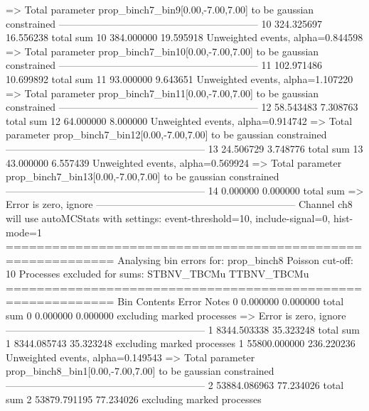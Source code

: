   => Total parameter prop_binch7_bin9[0.00,-7.00,7.00] to be gaussian constrained
------------------------------------------------------------
10         324.325697      16.556238       total sum                     
10         384.000000      19.595918       Unweighted events, alpha=0.844598
  => Total parameter prop_binch7_bin10[0.00,-7.00,7.00] to be gaussian constrained
------------------------------------------------------------
11         102.971486      10.699892       total sum                     
11         93.000000       9.643651        Unweighted events, alpha=1.107220
  => Total parameter prop_binch7_bin11[0.00,-7.00,7.00] to be gaussian constrained
------------------------------------------------------------
12         58.543483       7.308763        total sum                     
12         64.000000       8.000000        Unweighted events, alpha=0.914742
  => Total parameter prop_binch7_bin12[0.00,-7.00,7.00] to be gaussian constrained
------------------------------------------------------------
13         24.506729       3.748776        total sum                     
13         43.000000       6.557439        Unweighted events, alpha=0.569924
  => Total parameter prop_binch7_bin13[0.00,-7.00,7.00] to be gaussian constrained
------------------------------------------------------------
14         0.000000        0.000000        total sum                     
  => Error is zero, ignore      
------------------------------------------------------------
Channel ch8 will use autoMCStats with settings: event-threshold=10, include-signal=0, hist-mode=1
============================================================
Analysing bin errors for: prop_binch8
Poisson cut-off: 10
Processes excluded for sums: STBNV_TBCMu TTBNV_TBCMu
============================================================
Bin        Contents        Error           Notes                         
0          0.000000        0.000000        total sum                     
0          0.000000        0.000000        excluding marked processes    
  => Error is zero, ignore      
------------------------------------------------------------
1          8344.503338     35.323248       total sum                     
1          8344.085743     35.323248       excluding marked processes    
1          55800.000000    236.220236      Unweighted events, alpha=0.149543
  => Total parameter prop_binch8_bin1[0.00,-7.00,7.00] to be gaussian constrained
------------------------------------------------------------
2          53884.086963    77.234026       total sum                     
2          53879.791195    77.234026       excluding marked processes    
